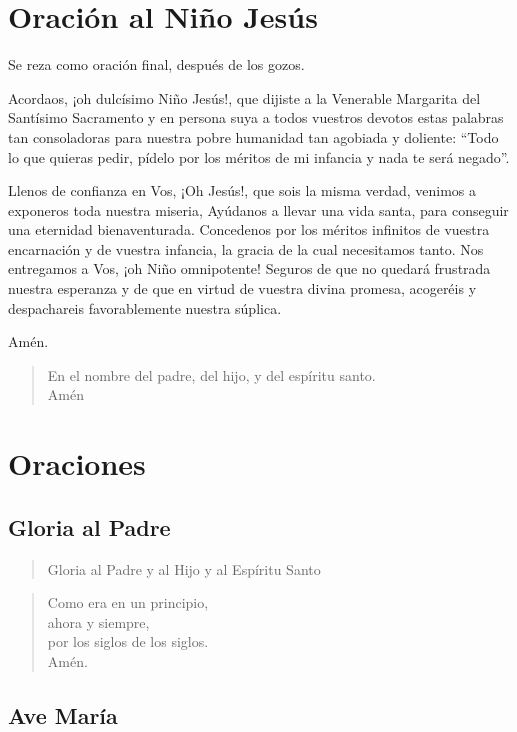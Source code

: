 \documentclass[spanish,utf8,twocolumn]{chlart}
\newenvironment{summary}{\begingroup
	\small\sffamily\itshape%
	\setlength{\leftskip}{3em}\setlength{\rightskip}{3em}\noindent
	}{\par\endgroup}
\newenvironment{lectura}{\begingroup\color{lector}}{\endgroup\par}
\newenvironment{uno}{%
	\begin{verse}\color{lector}}{\end{verse}}
\newenvironment{todos}{%
	\begin{verse}\color{responden}}{\end{verse}}
\newenvironment{gozo}{\begin{verse}\color{lector}}{\end{verse}}
\begin{document}
\section{Oración al Niño Jesús}
\begin{summary}
Se reza como oración final, después de los gozos.
\end{summary}
\begin{lectura}
Acordaos, ¡oh dulcísimo Niño Jesús!, que dijiste a la Venerable
Margarita del Santísimo Sacramento y en persona suya a todos vuestros
devotos estas palabras tan consoladoras para nuestra pobre humanidad tan
agobiada y doliente:
“Todo lo que quieras pedir, pídelo por los méritos de mi infancia y nada
te será negado”.

Llenos de confianza en Vos, ¡Oh Jesús!, que sois la misma verdad,
venimos a exponeros toda nuestra miseria, Ayúdanos a llevar una vida
santa, para conseguir una eternidad bienaventurada.
Concedenos por los méritos infinitos de vuestra encarnación y de vuestra
infancia, la gracia de la cual necesitamos tanto.
Nos entregamos a Vos, ¡oh Niño omnipotente!
Seguros de que no quedará frustrada nuestra esperanza y de que en virtud
de vuestra divina promesa, acogeréis y despachareis favorablemente
nuestra súplica.

Amén.
\end{lectura}
\begin{gozo}
En el nombre del padre, del hijo, y del espíritu santo.\\Amén
\end{gozo}

\section*{Oraciones}
\subsection*{Gloria al Padre}

\begin{uno}
Gloria al Padre y al Hijo y al Espíritu Santo
\end{uno}

\begin{todos}
Como era en un principio,\\ahora y siempre,\\por los siglos de los siglos.\\
Amén.
\end{todos}

\subsection*{Ave María}
\end{document}
